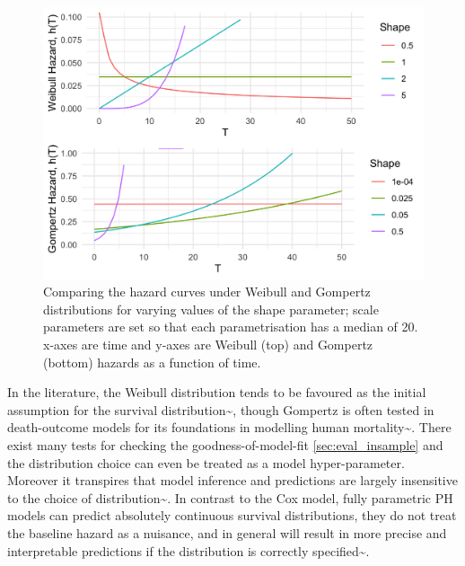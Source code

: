 \documentclass[
  letterpaper,
]{scrbook}
\theoremstyle{plain}
\theoremstyle{definition}
\theoremstyle{remark}
\begin{document}
\begin{figure}

{\centering \includegraphics{./images/classical/hazards.png}

}

\caption{\label{fig-survhazards}Comparing the hazard curves under
Weibull and Gompertz distributions for varying values of the shape
parameter; scale parameters are set so that each parametrisation has a
median of 20. x-axes are time and y-axes are Weibull (top) and Gompertz
(bottom) hazards as a function of time.}

\end{figure}

In the literature, the Weibull distribution tends to be favoured as the
initial assumption for the survival
distribution\textasciitilde{}\cite{Gensheimer2018, Habibi2018, Hielscher2010, CoxSnell1968, Rahman2017},
though Gompertz is often tested in death-outcome models for its
foundations in modelling human
mortality\textasciitilde{}\cite{Gompertz1825}. There exist many tests
for checking the goodness-of-model-fit \ref{sec:eval_insample} and the
distribution choice can even be treated as a model hyper-parameter.
Moreover it transpires that model inference and predictions are largely
insensitive to the choice of
distribution\textasciitilde{}\cite{Collett2014, Reid1994}. In contrast
to the Cox model, fully parametric PH models can predict absolutely
continuous survival distributions, they do not treat the baseline hazard
as a nuisance, and in general will result in more precise and
interpretable predictions if the distribution is correctly
specified\textasciitilde{}\cite{Reid1994, RoystonParmar2002}.
\end{document}
